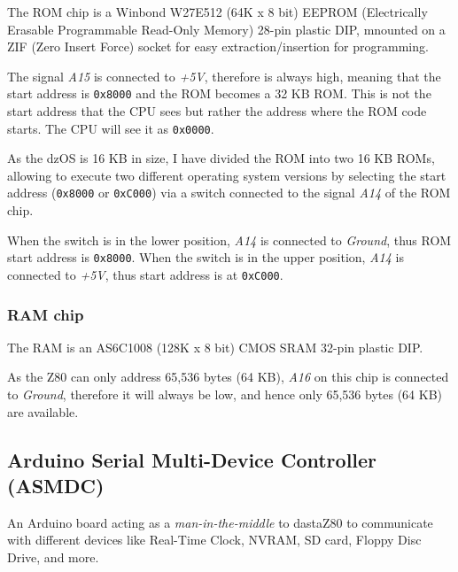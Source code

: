 \documentclass[a4paper,11pt]{article}
\begin{document}
    The ROM chip is a Winbond W27E512 (64K x 8 bit) EEPROM (Electrically Erasable
    Programmable Read-Only Memory) 28-pin plastic DIP, mnounted on a ZIF (Zero
    Insert Force) socket for easy extraction/insertion for programming.

    The signal \textit{A15} is connected to \textit{+5V}, therefore is always
    high, meaning that the start address is \texttt{0x8000} and the ROM becomes
    a 32 KB ROM. This is not the start address that the CPU sees but rather the
    address where the ROM code starts. The CPU will see it as \texttt{0x0000}.

    As the dzOS is 16 KB in size, I have divided the ROM into two 16 KB ROMs, 
    allowing to execute two different operating system versions by selecting the
    start address (\texttt{0x8000} or \texttt{0xC000}) via a switch connected to
    the signal \textit{A14} of the ROM chip.

    When the switch is in the lower position, \textit{A14} is connected to 
    \textit{Ground}, thus ROM start address is \texttt{0x8000}. When the switch
    is in the upper position, \textit{A14} is connected to \textit{+5V}, thus
    start address is at \texttt{0xC000}.

    \subsubsection{RAM chip}

    The RAM is an AS6C1008 (128K x 8 bit) CMOS SRAM 32-pin plastic DIP.

    As the Z80 can only address 65,536 bytes (64 KB), \textit{A16} on this chip
    is connected to \textit{Ground}, therefore it will always be low, and hence
    only 65,536 bytes (64 KB) are available.

    \subsection{ Arduino Serial Multi-Device Controller (ASMDC)}

    An Arduino board acting as a \textit{man-in-the-middle} to dastaZ80 to
    communicate with different devices like Real-Time Clock, NVRAM, SD card,
    Floppy Disc Drive, and more.
\end{document}

